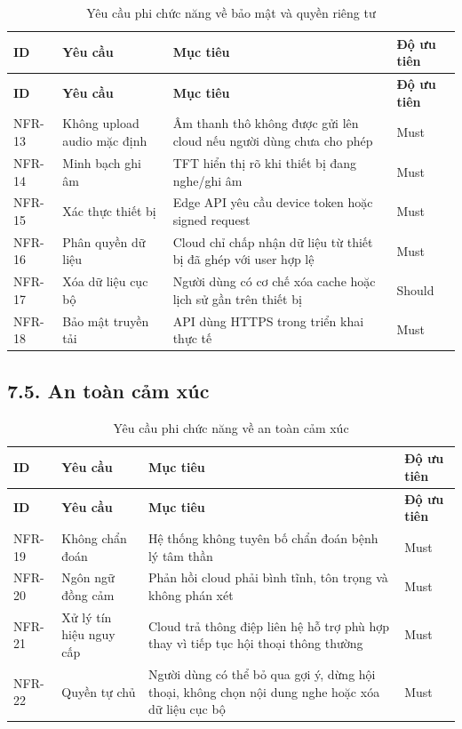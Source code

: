 \documentclass[12pt,a4paper]{article}
\begin{document}
\begin{center}
\scriptsize
\begin{longtable}{|P{0.13\textwidth}|P{0.25\textwidth}|P{0.38\textwidth}|P{0.14\textwidth}|}
\caption{Yêu cầu phi chức năng về bảo mật và quyền riêng tư}\\
\hline
\textbf{ID} & \textbf{Yêu cầu} & \textbf{Mục tiêu} & \textbf{Độ ưu tiên} \\
\hline
\endfirsthead
\hline
\textbf{ID} & \textbf{Yêu cầu} & \textbf{Mục tiêu} & \textbf{Độ ưu tiên} \\
\hline
\endhead
NFR-13 & Không upload audio mặc định & Âm thanh thô không được gửi lên cloud nếu người dùng chưa cho phép & Must \\
\hline
NFR-14 & Minh bạch ghi âm & TFT hiển thị rõ khi thiết bị đang nghe/ghi âm & Must \\
\hline
NFR-15 & Xác thực thiết bị & Edge API yêu cầu device token hoặc signed request & Must \\
\hline
NFR-16 & Phân quyền dữ liệu & Cloud chỉ chấp nhận dữ liệu từ thiết bị đã ghép với user hợp lệ & Must \\
\hline
NFR-17 & Xóa dữ liệu cục bộ & Người dùng có cơ chế xóa cache hoặc lịch sử gần trên thiết bị & Should \\
\hline
NFR-18 & Bảo mật truyền tải & API dùng HTTPS trong triển khai thực tế & Must \\
\hline
\end{longtable}
\normalsize
\end{center}


\subsection*{7.5. An toàn cảm xúc}

\begin{center}
\scriptsize
\begin{longtable}{|P{0.13\textwidth}|P{0.25\textwidth}|P{0.38\textwidth}|P{0.14\textwidth}|}
\caption{Yêu cầu phi chức năng về an toàn cảm xúc}\\
\hline
\textbf{ID} & \textbf{Yêu cầu} & \textbf{Mục tiêu} & \textbf{Độ ưu tiên} \\
\hline
\endfirsthead
\hline
\textbf{ID} & \textbf{Yêu cầu} & \textbf{Mục tiêu} & \textbf{Độ ưu tiên} \\
\hline
\endhead
NFR-19 & Không chẩn đoán & Hệ thống không tuyên bố chẩn đoán bệnh lý tâm thần & Must \\
\hline
NFR-20 & Ngôn ngữ đồng cảm & Phản hồi cloud phải bình tĩnh, tôn trọng và không phán xét & Must \\
\hline
NFR-21 & Xử lý tín hiệu nguy cấp & Cloud trả thông điệp liên hệ hỗ trợ phù hợp thay vì tiếp tục hội thoại thông thường & Must \\
\hline
NFR-22 & Quyền tự chủ & Người dùng có thể bỏ qua gợi ý, dừng hội thoại, không chọn nội dung nghe hoặc xóa dữ liệu cục bộ & Must \\
\hline
\end{longtable}
\normalsize
\end{center}
\end{document}
